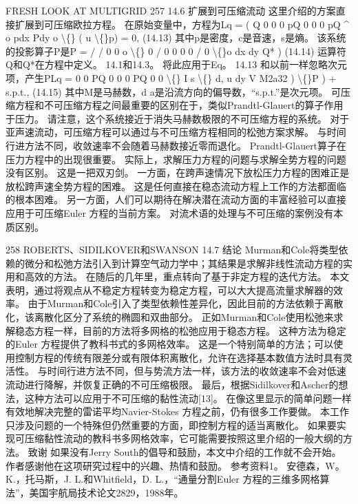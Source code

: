 \documentclass[UTF8,11pt,a4paper,openany,fontset=fandol]{ctexbook}
\begin{document}
FRESH LOOK AT MULTIGRID 257 14.6 扩展到可压缩流动 这里介绍的方案直接扩展到可压缩欧拉方程。 在原始变量中，方程为Lq = ( Q 0 0 0 pQ 0 0 0 pQ \textasciicircum{} o pdx Pdy o \textbackslash\{\} ( u \textbackslash\{\}p) = 0, (14.13) 其中p是密度，c是音速，s是熵。 该系统的投影算子P是P = / / 0 0 o \textbackslash\{\} 0 / 0 0 0 0 / 0 \textbackslash\{\}o dx dy Q* ) (14.14) 运算符Q和Q*在方程中定义。 14.1和14.3。 将此应用于Eq。 14.13 和以前一样忽略次元项，产生PLq = 0 0 PQ 0 0 0 PQ 0 0 \textbackslash\{\} I s \textbackslash\{\} d, u dy V M2a32 ) \textbackslash\{\}P ) + s.p.t., (14.15) 其中M是马赫数，d a是沿流方向的偏导数，“s.p.t.”是次元项。 可压缩方程和不可压缩方程之间最重要的区别在于，类似Prandtl-Glauert的算子作用于压力。 请注意，这个系统接近于消失马赫数极限的不可压缩方程的系统。 对于亚声速流动，可压缩方程可以通过与不可压缩方程相同的松弛方案求解。 与时间行进方法不同，收敛速率不会随着马赫数接近零而退化。 Prandtl-Glauert算子在压力方程中的出现很重要。 实际上，求解压力方程的问题与求解全势方程的问题没有区别。 这是一把双刃剑。 一方面，在跨声速情况下放松压力方程的困难正是放松跨声速全势方程的困难。 这是任何直接在稳态流动方程上工作的方法都面临的根本困难。 另一方面，人们可以期待在解决潜在流动方面的丰富经验可以直接应用于可压缩Euler 方程的当前方案。 对流术语的处理与不可压缩的案例没有本质区别。

258 ROBERTS、SIDILKOVER和SWANSON 14.7 结论 Murman和Cole将类型依赖的微分和松弛方法引入到计算空气动力学中；其结果是求解非线性流动方程的实用和高效的方法。 在随后的几年里，重点转向了基于非定方程的迭代方法。 本文表明，通过将观点从不稳定方程转变为稳定方程，可以大大提高流量求解器的效率。 由于Murman和Cole引入了类型依赖性差异化，因此目前的方法依赖于离散化，该离散化区分了系统的椭圆和双曲部分。 正如Murman和Cole使用松弛来求解稳态方程一样，目前的方法将多网格的松弛应用于稳态方程。 这种方法为稳定的Euler 方程提供了教科书式的多网格效率。 这是一个特别简单的方法；可以使用控制方程的传统有限差分或有限体积离散化，允许在选择基本数值方法时具有灵活性。 与时间行进方法不同，但与势流方法一样，该方法的收敛速率不会对低速流动进行降解，并恢复正确的不可压缩极限。 最后，根据Sidilkover和Ascher的想法，这种方法可以应用于不可压缩的黏性流动[13]。 在像这里显示的简单问题一样有效地解决完整的雷诺平均Navier-Stokes 方程之前，仍有很多工作要做。 本工作只涉及问题的一个特殊但仍然重要的方面，即控制方程的适当离散化。 如果要实现可压缩黏性流动的教科书多网格效率，它可能需要按照这里介绍的一般大纲的方法。 致谢 如果没有Jerry South的倡导和鼓励，本文中介绍的工作就不会开始。 作者感谢他在这项研究过程中的兴趣、热情和鼓励。 参考资料1。 安德森，W。 K.，托马斯，J. L.和Whitfield，D. L.，“通量分割Euler 方程的三维多网格算法”，美国宇航局技术论文2829，1988年。
\end{document}
